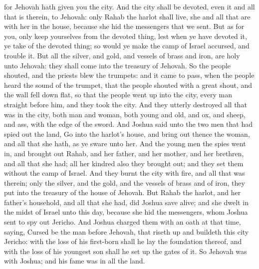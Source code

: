 for Jehovah hath given you the city. And the city shall be devoted, even it and all that is therein, to Jehovah: only Rahab the harlot shall live, she and all that are with her in the house, because she hid the messengers that we sent. But as for you, only keep yourselves from the devoted thing, lest when ye have devoted it, ye take of the devoted thing; so would ye make the camp of Israel accursed, and trouble it. But all the silver, and gold, and vessels of brass and iron, are holy unto Jehovah: they shall come into the treasury of Jehovah. So the people shouted, and the priests blew the trumpets: and it came to pass, when the people heard the sound of the trumpet, that the people shouted with a great shout, and the wall fell down flat, so that the people went up into the city, every man straight before him, and they took the city. And they utterly destroyed all that was in the city, both man and woman, both young and old, and ox, and sheep, and ass, with the edge of the sword.  And Joshua said unto the two men that had spied out the land, Go into the harlot’s house, and bring out thence the woman, and all that she hath, as ye sware unto her. And the young men the spies went in, and brought out Rahab, and her father, and her mother, and her brethren, and all that she had; all her kindred also they brought out; and they set them without the camp of Israel. And they burnt the city with fire, and all that was therein; only the silver, and the gold, and the vessels of brass and of iron, they put into the treasury of the house of Jehovah. But Rahab the harlot, and her father’s household, and all that she had, did Joshua save alive; and she dwelt in the midst of Israel unto this day, because she hid the messengers, whom Joshua sent to spy out Jericho. And Joshua charged them with an oath at that time, saying, Cursed be the man before Jehovah, that riseth up and buildeth this city Jericho: with the loss of his first-born shall he lay the foundation thereof, and with the loss of his youngest son shall he set up the gates of it. So Jehovah was with Joshua; and his fame was in all the land. 

